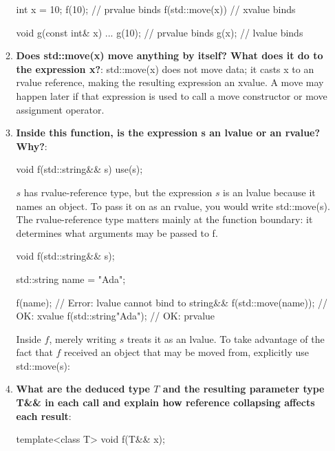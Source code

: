 \documentclass{report}
\begin{document}
\begin{itemize}
\begin{enumerate}
\begin{cppcode}
                        int x = 10;
                        f(10); // prvalue binds
                        f(std::move(x)) // xvalue binds
                    \end{cppcode}
                    \bigbreak \noindent 
                    \begin{cppcode}
                        void g(const int& x) { ... }
                        g(10); // prvalue binds
                        g(x); // lvalue binds
                    \end{cppcode}
                \item \textbf{Does std::move(x) move anything by itself? What does it do to the expression x?}: std::move(x) does not move data; it casts x to an rvalue reference, making the resulting expression an xvalue. A move may happen later if that expression is used to call a move constructor or move assignment operator.
                \item \textbf{Inside this function, is the expression s an lvalue or an rvalue? Why?}:
                    \bigbreak \noindent 
                    \begin{cppcode}
                        void f(std::string&& s) {
                            use(s);
                        }
                    \end{cppcode}
                    \bigbreak \noindent 
                    $s$ has rvalue-reference type, but the expression $s$ is an lvalue because it names an object. To pass it on as an rvalue, you would write std::move(s).
                    \bigbreak \noindent 
                    The rvalue-reference type matters mainly at the function boundary: it determines what arguments may be passed to f.
                    \bigbreak \noindent 
                    \begin{cppcode}
                        void f(std::string&& s);

                        std::string name = "Ada";

                        f(name);                 // Error: lvalue cannot bind to string&&
                        f(std::move(name));      // OK: xvalue
                        f(std::string{"Ada"});   // OK: prvalue
                    \end{cppcode}
                    \bigbreak \noindent 
                    Inside $f$, merely writing $s$ treats it as an lvalue. To take advantage of the fact that $f$ received an object that may be moved from, explicitly use std::move(s):
                \item \textbf{What are the deduced type $T$ and the resulting parameter type T\&\& in each call and explain how reference collapsing affects each result}: 
                    \bigbreak \noindent 
                    \begin{cppcode}
                        template<class T>
                        void f(T&& x);


\end{cppcode}
\end{enumerate}
\end{itemize}
\end{document}
